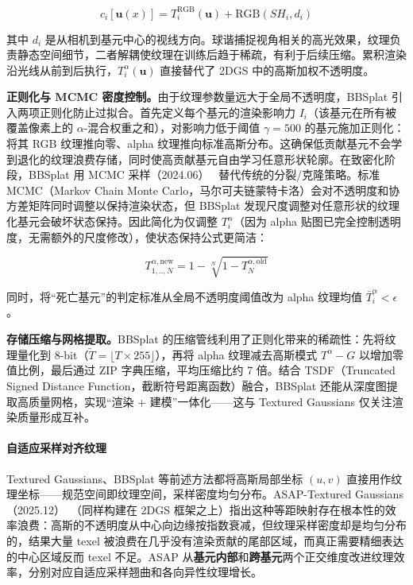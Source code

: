 \begin{equation}
c_i[\mathbf{u}(x)] = T_i^{\text{RGB}}(\mathbf{u}) + \text{RGB}(SH_i, d_i)
\end{equation}

其中 $d_i$ 是从相机到基元中心的视线方向。球谐捕捉视角相关的高光效果，纹理负责静态空间细节，二者解耦使纹理在训练后趋于稀疏，有利于后续压缩。累积渲染沿光线从前到后执行，$T_i^{\alpha}(\mathbf{u})$ 直接替代了 2DGS 中的高斯加权不透明度。

\textbf{正则化与 MCMC 密度控制。}由于纹理参数量远大于全局不透明度，BBSplat 引入两项正则化防止过拟合。首先定义每个基元的渲染影响力 $I_i$（该基元在所有被覆盖像素上的 $\alpha$-混合权重之和），对影响力低于阈值 $\gamma=500$ 的基元施加正则化：将其 RGB 纹理推向零、alpha 纹理推向标准高斯分布。这确保低贡献基元不会学到退化的纹理浪费存储，同时使高贡献基元自由学习任意形状轮廓。在致密化阶段，BBSplat 用 MCMC 采样（2024.06）~\cite{2406_04451} 替代传统的分裂/克隆策略。标准 MCMC（Markov Chain Monte Carlo，马尔可夫链蒙特卡洛）会对不透明度和协方差矩阵同时调整以保持渲染状态，但 BBSplat 发现尺度调整对任意形状的纹理化基元会破坏状态保持。因此简化为仅调整 $T_i^{\alpha}$（因为 alpha 贴图已完全控制透明度，无需额外的尺度修改），使状态保持公式更简洁：

\begin{equation}
T_{1,..,N}^{\alpha,\text{new}} = 1 - \sqrt[N]{1 - T_N^{\alpha,\text{old}}}
\end{equation}

同时，将``死亡基元''的判定标准从全局不透明度阈值改为 alpha 纹理均值 $\bar{T}_i^{\alpha} < \epsilon$。

\textbf{存储压缩与网格提取。}BBSplat 的压缩管线利用了正则化带来的稀疏性：先将纹理量化到 8-bit（$\tilde{T} = \lfloor T \times 255 \rfloor$），再将 alpha 纹理减去高斯模式 $T^{\alpha} - G$ 以增加零值比例，最后通过 ZIP 字典压缩，平均压缩比约 7 倍。结合 TSDF（Truncated Signed Distance Function，截断符号距离函数）融合，BBSplat 还能从深度图提取高质量网格，实现``渲染 + 建模''一体化——这与 Textured Gaussians 仅关注渲染质量形成互补。

\paragraph{自适应采样对齐纹理}

Textured Gaussians、BBSplat 等前述方法都将高斯局部坐标 $(u,v)$ 直接用作纹理坐标——规范空间即纹理空间，采样密度均匀分布。ASAP-Textured Gaussians（2025.12）~\cite{2512_14039}（同样构建在 2DGS 框架之上）指出这种等距映射存在根本性的效率浪费：高斯的不透明度从中心向边缘按指数衰减，但纹理采样密度却是均匀分布的，结果大量 texel 被浪费在几乎没有渲染贡献的尾部区域，而真正需要精细表达的中心区域反而 texel 不足。ASAP 从\textbf{基元内部}和\textbf{跨基元}两个正交维度改进纹理效率，分别对应自适应采样翘曲和各向异性纹理增长。

